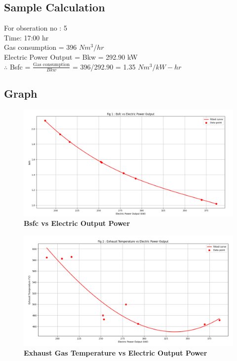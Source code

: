 \documentclass[12pt]{article}
\begin{document}
          \subsection*{Sample Calculation}
          For obseration no : 5 \\
          Time: 17:00 hr \\
          Gas consumption = 396 $Nm^3/hr$ \\
          Electric Power Output = Bkw = 292.90 kW \\

          $\therefore$ Bsfc = $\frac{\text{Gas consumption}}{Bkw}$  = 396/292.90 = 1.35 $Nm^3/kW-hr$ \\ 


          \subsection*{Graph}
          \begin{figure}[H]
            \begin{center}
              \includegraphics[width=0.99\linewidth]{img/Figure_1.png}
              \textbf{Bsfc vs Electric Output Power}
            \end{center}
          \end{figure}

          \begin{figure}[H]
            \begin{center}
              \includegraphics[width=0.99\linewidth]{img/Figure_2.png}
              \textbf{Exhaust Gas Temperature vs Electric Output Power}
            \end{center}
          \end{figure}
\end{document}
